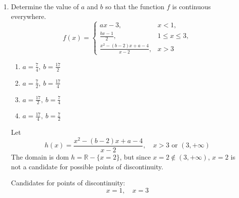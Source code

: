 \begin{enumerate}
\begin{enumerate}
    Similarly, by evaluating the upper bound limit
    \begin{align*}
        \lim_{x \to -\infty} \frac{x^2 + 1}{\sqrt{x^4 + 1}}
        &= \lim_{x \to -\infty} \frac{x^2\left(1 + \frac{1}{x^2}\right)}{\sqrt{x^4\left(1 + \frac{1}{x^4}\right)}} \\
        &= \lim_{x \to -\infty} \frac{x^2\left(1 + \frac{1}{x^2}\right)}{\lvert x^2 \rvert \sqrt{1 + \frac{1}{x^4}}}
    \end{align*}
    where $\lvert x^2 \rvert = x^2 \quad \forall x \in \mathbb{R}$. Substituting this in:
    \begin{align*}
        \lim_{x \to -\infty} \frac{x^2\left(1 + \frac{1}{x^2}\right)}{x^2 \sqrt{1 + \frac{1}{x^4}}}
        &= \lim_{x \to -\infty} \frac{1 + \frac{1}{x^2}}{\sqrt{1 + \frac{1}{x^4}}} \\
        &= \frac{1 + 0}{\sqrt{1 + 0}} \\
        &= \frac{1}{1} = 1
    \end{align*}

    Therefore, by the Squeeze Theorem:
    \[
        \boxed{\lim_{x \to -\infty} \frac{x^2 - \sin x}{\sqrt{x^4 + 1}} = 1}
    \]
\end{enumerate}


\item Determine the value of $a$ and $b$ so that the function $f$ is continuous everywhere. $$\displaystyle f(x) = \begin{cases}
    ax - 3, & x < 1, \\[10pt]
    \frac{bx - 1}{2}, & 1 \leq x \leq 3, \\[10pt]
    \frac{x^2 - (b - 2)x + a - 4}{x - 2}, & x > 3
\end{cases}$$
\begin{enumerate}
    \item $a = \frac{7}{4},\ b = \frac{17}{2}$
    \item $a = \frac{7}{2},\ b = \frac{17}{4}$
    \item $a = \frac{17}{2},\ b = \frac{7}{4}$
    \item $a = \frac{17}{4},\ b = \frac{7}{2}$
\end{enumerate}
Let 
    \[
        h(x) = \frac{x^2 - (b-2)x + a - 4}{x - 2}, \quad x > 3 \text{ or } (3, +\infty)
    \]
    The domain is $\text{dom } h = \mathbb{R} - \{x=2\}$, but since $x=2 \notin (3, +\infty)$, $x=2$ is not a candidate for possible points of discontinuity.

    Candidates for points of discontinuity:
    \[ x = 1, \quad x = 3 \]


\end{enumerate}
